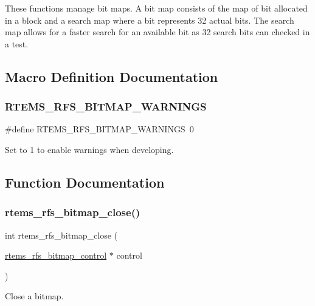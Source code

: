 These functions manage bit maps. A bit map consists of the map of bit allocated in a block and a search map where a bit represents 32 actual bits. The search map allows for a faster search for an available bit as 32 search bits can checked in a test. 

\subsection{Macro Definition Documentation}
\mbox{\label{rtems-rfs-bitmaps_8c_a79f700881a8cd7db9993db7ce97502e8}} 
\subsubsection{\texorpdfstring{RTEMS\_RFS\_BITMAP\_WARNINGS}{RTEMS\_RFS\_BITMAP\_WARNINGS}}
{\footnotesize\ttfamily \#define R\+T\+E\+M\+S\+\_\+\+R\+F\+S\+\_\+\+B\+I\+T\+M\+A\+P\+\_\+\+W\+A\+R\+N\+I\+N\+GS~0}

Set to 1 to enable warnings when developing. 

\subsection{Function Documentation}
\mbox{\label{rtems-rfs-bitmaps_8c_a9c5c4b4e9f3e518b9b1d9bed4824c67c}} 
\subsubsection{\texorpdfstring{rtems\_rfs\_bitmap\_close()}{rtems\_rfs\_bitmap\_close()}}
{\footnotesize\ttfamily int rtems\+\_\+rfs\+\_\+bitmap\+\_\+close (\begin{DoxyParamCaption}\item[{\mbox{\hyperlink{rtems-rfs-bitmaps_8h_aa1b1de5abc294444428eb1038d7f898b}{rtems\+\_\+rfs\+\_\+bitmap\+\_\+control}} $\ast$}]{control }\end{DoxyParamCaption})}

Close a bitmap.


